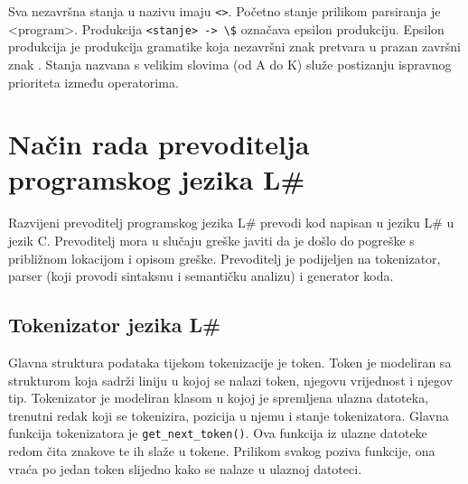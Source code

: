\documentclass[times, utf8, zavrsni]{fer}
\begin{document}
Sva nezavršna stanja u nazivu imaju \verb|<>|. Početno stanje prilikom parsiranja je <program>. Produkcija \verb|<stanje> -> \$|
označava epsilon produkciju. Epsilon produkcija je produkcija gramatike koja nezavršni znak pretvara u prazan završni znak \citep{ppj}. 
Stanja nazvana s velikim slovima (od A do K) služe postizanju ispravnog prioriteta 
između operatorima.

\chapter{Način rada prevoditelja programskog jezika L\#}
Razvijeni prevoditelj programskog jezika L\# prevodi kod napisan u jeziku L\# u jezik C. Prevoditelj
mora u slučaju greške javiti da je došlo do pogreške s približnom lokacijom i opisom greške. Prevoditelj
je podijeljen na tokenizator, parser (koji provodi sintaksnu i semantičku analizu) i generator koda.

\section{Tokenizator jezika L\#}
Glavna struktura podataka tijekom tokenizacije je token. Token je modeliran sa strukturom koja sadrži liniju u kojoj se nalazi token,
njegovu vrijednost i njegov tip. Tokenizator je modeliran klasom u kojoj je spremljena ulazna datoteka, trenutni redak koji se tokenizira, pozicija u njemu 
i stanje tokenizatora. Glavna funkcija tokenizatora je \verb|get_next_token()|. Ova funkcija iz
ulazne datoteke redom čita znakove te ih slaže u tokene. Prilikom svakog poziva funkcije, ona vraća po jedan token
slijedno kako se nalaze u ulaznoj datoteci.
\end{document}
